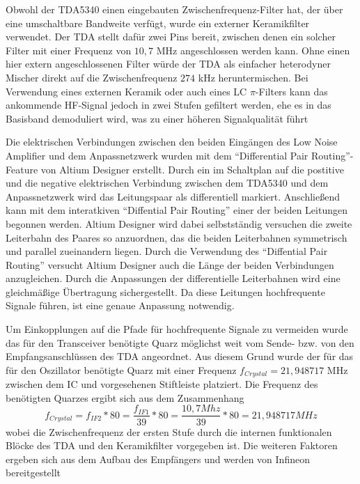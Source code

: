 Obwohl der TDA5340 einen eingebauten Zwischenfrequenz-Filter hat, der über eine umschaltbare Bandweite verfügt, wurde ein externer Keramikfilter verwendet. Der TDA stellt dafür zwei Pins bereit, zwischen denen ein solcher Filter mit einer Frequenz von  $10,7$ MHz angeschlossen werden kann. Ohne einen hier extern angeschlossenen Filter würde der TDA als einfacher heterodyner Mischer direkt auf die Zwischenfrequenz $274$ kHz heruntermischen. Bei Verwendung eines externen Keramik oder auch eines LC $\pi$-Filters kann das ankommende HF-Signal jedoch in zwei Stufen gefiltert werden, ehe es in das Basisband demoduliert wird, was zu einer höheren Signalqualität führt%

Die elektrischen Verbindungen zwischen den beiden Eingängen des Low Noise Amplifier und dem Anpassnetzwerk wurden mit dem \enquote{Differential Pair Routing}-Feature von Altium Designer erstellt. Durch ein im Schaltplan auf die postitive und die negative elektrischen Verbindung zwischen dem TDA5340 und dem Anpassnetzwerk wird das Leitungspaar als differentiell markiert. Anschließend kann mit dem interatkiven \enquote{Diffential Pair Routing} einer der beiden Leitungen begonnen werden. Altium Designer wird dabei selbstständig versuchen die zweite Leiterbahn des Paares so anzuordnen, das die beiden Leiterbahnen symmetrisch und parallel zueinandern liegen. %
Durch die Verwendung des \enquote{Diffential Pair Routing} versucht Altium Designer auch die Länge der beiden Verbindungen anzugleichen. Durch die Anpassungen der differentielle Leiterbahnen wird eine gleichmäßige Übertragung sichergestellt. Da diese Leitungen hochfrequente Signale führen, ist eine genaue Anpassung notwendig.




Um Einkopplungen auf die Pfade für hochfrequente Signale zu vermeiden wurde das für den Transceiver benötigte Quarz möglichst weit vom Sende- bzw. von den Empfangsanschlüssen des TDA angeordnet. Aus diesem Grund wurde der für das für den Oszillator benötigte Quarz mit einer Frequenz $f_{Crystal}=21,948717$ MHz zwischen dem \ac{IC} und vorgesehenen Stiftleiste platziert.  Die Frequenz des benötigten Quarzes ergibt sich aus dem  Zusammenhang
\begin{equation}\label{eq:fsys}
f_{Crystal} = f_{IF2} * 80 = \frac{f_{IF1}}{39} * 80  = \frac{10,7 Mhz}{39} * 80 = 21,948717 MHz
\end{equation}
wobei die Zwischenfrequenz der ersten Stufe durch die internen funktionalen Blöcke des TDA und den Keramikfilter vorgegeben ist. Die weiteren Faktoren ergeben sich aus dem Aufbau des Empfängers und werden von Infineon bereitgestellt%


